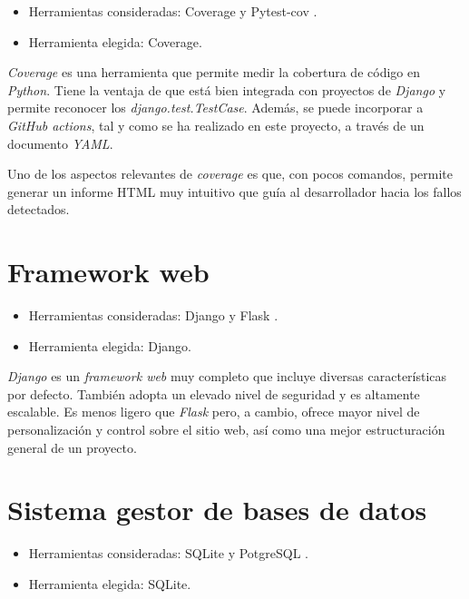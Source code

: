 \begin{itemize}
\tightlist
\item
  Herramientas consideradas: Coverage  \citep{online:coverage} y Pytest-cov \citep{online:pytest_cov}.
\item
  Herramienta elegida: Coverage.
\end{itemize}

\emph{Coverage} es una herramienta que permite medir la cobertura de código en \emph{Python}. 
Tiene la ventaja de que está bien integrada con proyectos de \emph{Django} y permite reconocer
los \emph{django.test.TestCase}. Además, se puede incorporar a \emph{GitHub actions}, tal y como 
se ha realizado en este proyecto, a través de un documento \emph{YAML}.

Uno de los aspectos relevantes de \emph{coverage} es que, con pocos comandos, permite generar
un informe HTML muy intuitivo que guía al desarrollador hacia los fallos detectados. 


\section{Framework web}\label{framework_web}

\begin{itemize}
\tightlist
\item
  Herramientas consideradas: Django \citep{online:django} y Flask \citep{online:flask}.
\item
  Herramienta elegida: Django.
\end{itemize}

\emph{Django} es un \emph{framework web} muy completo que incluye diversas características por defecto. También adopta un elevado nivel de seguridad y es altamente escalable. Es menos ligero que
\emph{Flask} pero, a cambio, ofrece mayor nivel de personalización y control sobre el sitio web, así como una mejor estructuración general de un proyecto.  


\section{Sistema gestor de bases de datos}\label{sgbd}

\begin{itemize}
\tightlist
\item
  Herramientas consideradas: SQLite \citep{online:sqlite} y PotgreSQL \citep{online:postgresql}.
\item
  Herramienta elegida: SQLite.
\end{itemize}

